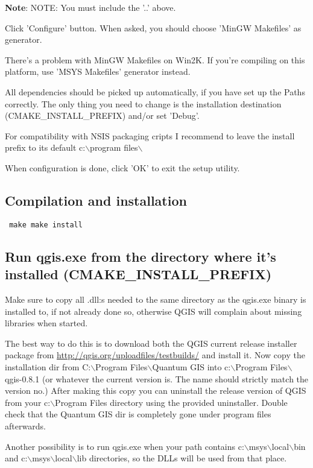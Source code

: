 \textbf{Note}:   NOTE: You must include the '..' above.

Click 'Configure' button.  When asked, you should choose 'MinGW Makefiles'
as generator.

There's a problem with MinGW Makefiles on Win2K. If you're compiling on this
platform, use 'MSYS Makefiles' generator instead.

All dependencies should be picked up automatically, if you have set up the
Paths correctly. The only thing you need to change is the installation
destination (CMAKE\_INSTALL\_PREFIX) and/or set 'Debug'.

For compatibility with NSIS packaging cripts I recommend to leave the
install prefix to its default c:$\backslash$program files$\backslash$

When configuration is done, click 'OK' to exit the setup utility.

\subsection{Compilation and installation}
\begin{verbatim}
 make make install 
\end{verbatim}

\subsection{Run qgis.exe from the directory where it's installed (CMAKE\_INSTALL\_PREFIX)}
Make sure to copy all .dll:s needed to the same directory as the qgis.exe
binary is installed to, if not already done so, otherwise QGIS will complain
about missing libraries when started.

The best way to do this is to download both the QGIS current release installer
package from \url{http://qgis.org/uploadfiles/testbuilds/} and install it. Now copy
the installation dir from C:$\backslash$Program Files$\backslash$Quantum GIS into c:$\backslash$Program
Files$\backslash$qgis-0.8.1 (or whatever the current version is. The name should strictly
match the version no.) After making this copy you can uninstall the release
version of QGIS from your c:$\backslash$Program Files directory using the provided
uninstaller. Double check that the Quantum GIS dir is completely gone under
program files afterwards.

Another possibility is to run qgis.exe when your path contains
c:$\backslash$msys$\backslash$local$\backslash$bin and c:$\backslash$msys$\backslash$local$\backslash$lib directories, so the DLLs will be
used from that place.

